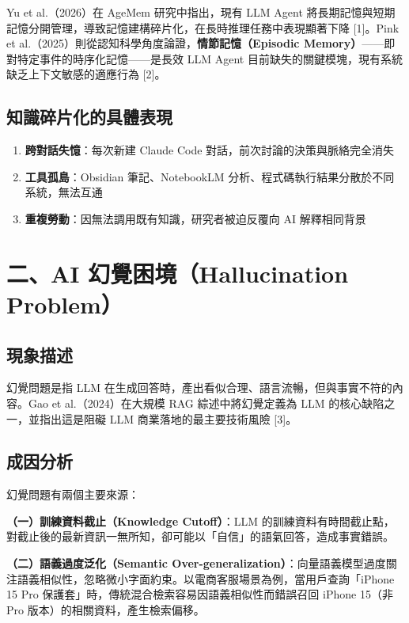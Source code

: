Yu et al.（2026）在 AgeMem 研究中指出，現有 LLM Agent
將長期記憶與短期記憶分開管理，導致記憶建構碎片化，在長時推理任務中表現顯著下降
{[}1{]}。Pink et
al.（2025）則從認知科學角度論證，\textbf{情節記憶（Episodic
Memory）}------即對特定事件的時序化記憶------是長效 LLM Agent
目前缺失的關鍵模塊，現有系統缺乏上下文敏感的適應行為 {[}2{]}。

\subsection{知識碎片化的具體表現}\label{ux77e5ux8b58ux788eux7247ux5316ux7684ux5177ux9ad4ux8868ux73fe}

\begin{enumerate}
\def\labelenumi{\arabic{enumi}.}
\tightlist
\item
  \textbf{跨對話失憶}：每次新建 Claude Code
  對話，前次討論的決策與脈絡完全消失
\item
  \textbf{工具孤島}：Obsidian 筆記、NotebookLM
  分析、程式碼執行結果分散於不同系統，無法互通
\item
  \textbf{重複勞動}：因無法調用既有知識，研究者被迫反覆向 AI
  解釋相同背景
\end{enumerate}

\section{二、AI 幻覺困境（Hallucination
Problem）}\label{ux4e8cai-ux5e7bux89baux56f0ux5883hallucination-problem}

\subsection{現象描述}\label{ux73feux8c61ux63cfux8ff0-1}

幻覺問題是指 LLM
在生成回答時，產出看似合理、語言流暢，但與事實不符的內容。Gao et
al.（2024）在大規模 RAG 綜述中將幻覺定義為 LLM
的核心缺陷之一，並指出這是阻礙 LLM 商業落地的最主要技術風險 {[}3{]}。

\subsection{成因分析}\label{ux6210ux56e0ux5206ux6790-1}

幻覺問題有兩個主要來源：

\textbf{（一）訓練資料截止（Knowledge Cutoff）}：LLM
的訓練資料有時間截止點，對截止後的最新資訊一無所知，卻可能以「自信」的語氣回答，造成事實錯誤。

\textbf{（二）語義過度泛化（Semantic
Over-generalization）}：向量語義模型過度關注語義相似性，忽略微小字面約束。以電商客服場景為例，當用戶查詢「iPhone
15 Pro 保護套」時，傳統混合檢索容易因語義相似性而錯誤召回 iPhone 15（非
Pro 版本）的相關資料，產生檢索偏移。

